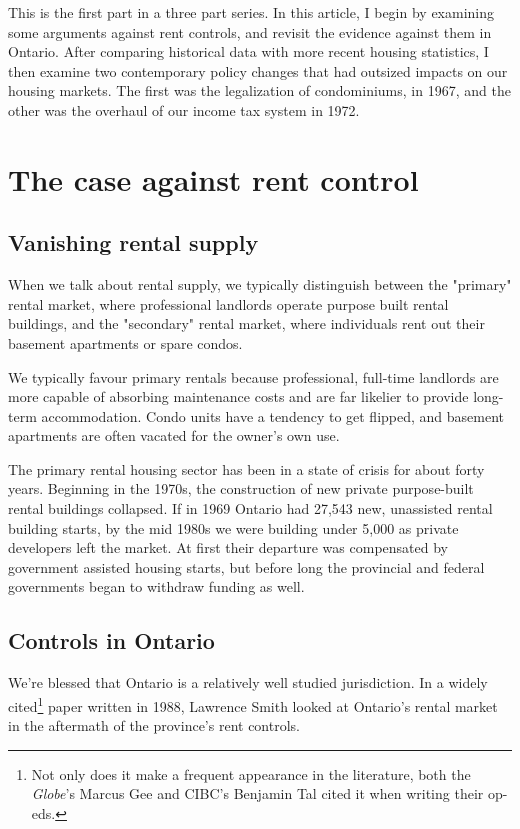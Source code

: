 This is the first part in a three part series. In this article, I begin by examining some arguments against rent controls, and revisit the evidence against them in Ontario. After comparing historical data with more recent housing statistics, I then examine two contemporary policy changes that had outsized impacts on our housing markets. The first was the legalization of condominiums, in 1967, and the other was the overhaul of our income tax system in 1972.


\section{The case against rent control}
\subsection{Vanishing rental supply}

When we talk about rental supply, we typically distinguish between the "primary" rental market, where professional landlords operate purpose built rental buildings, and the "secondary" rental market, where individuals rent out their basement apartments or spare condos.\cite{toronto-2006}

We typically favour primary rentals because professional, full-time landlords are more capable of absorbing maintenance costs and are far likelier to provide long-term accommodation. Condo units have a tendency to get flipped, and basement apartments are often vacated for the owner's own use.

The primary rental housing sector has been in a state of crisis for about forty years.\cite{smith-1983} Beginning in the 1970s, the construction of new private purpose-built rental buildings collapsed. If in 1969 Ontario had 27,543 new, unassisted rental building starts, by the mid 1980s we were building under 5,000 as private developers left the market.\cite{smith-1988} At first their departure was compensated by government assisted housing starts, but before long the provincial and federal governments began to withdraw funding as well.\cite{toronto-2006}


\subsection{Controls in Ontario}

We're blessed that Ontario is a relatively well studied jurisdiction. In a widely cited\footnote{\label{widely-cited}Not only does it make a frequent appearance in the literature, both the \emph{Globe}'s Marcus Gee\cite{gee-2017} and CIBC's Benjamin Tal\cite{tal-2017} cited it when writing their op-eds.} paper written in 1988, Lawrence Smith looked at Ontario's rental market in the aftermath of the province's rent controls.

